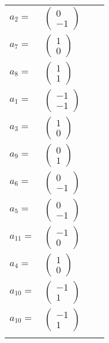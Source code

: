 \documentclass[1p]{elsarticle_modified}
\theoremstyle{definition}
\begin{document}
\begin{tabular}{m{7pt} m{180pt} m{7pt} m{180pt} }
\flushright $a_{2}=$&$\begin{pmatrix}0\\-1\end{pmatrix}$ \\
\flushright $a_{7}=$&$\begin{pmatrix}1\\0\end{pmatrix}$ \\
\flushright $a_{8}=$&$\begin{pmatrix}1\\1\end{pmatrix}$ \\
\flushright $a_{1}=$&$\begin{pmatrix}-1\\-1\end{pmatrix}$ \\
\flushright $a_{3}=$&$\begin{pmatrix}1\\0\end{pmatrix}$ \\
\flushright $a_{9}=$&$\begin{pmatrix}0\\1\end{pmatrix}$ \\
\flushright $a_{6}=$&$\begin{pmatrix}0\\-1\end{pmatrix}$ \\
\flushright $a_{5}=$&$\begin{pmatrix}0\\-1\end{pmatrix}$ \\
\flushright $a_{11}=$&$\begin{pmatrix}-1\\0\end{pmatrix}$ \\
\flushright $a_{4}=$&$\begin{pmatrix}1\\0\end{pmatrix}$ \\
\flushright $a_{10}=$&$\begin{pmatrix}-1\\1\end{pmatrix}$\\ \flushright $a_{10}=$&$\begin{pmatrix}-1\\1\end{pmatrix}$\\&\end{tabular}
\end{document}
